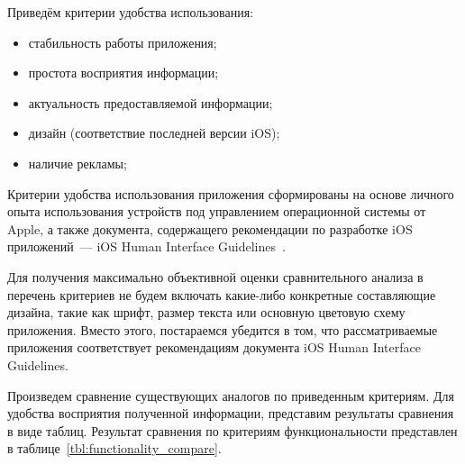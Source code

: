 Приведём критерии удобства использования:
\begin{itemize}
  \item стабильность работы приложения;
  \item простота восприятия информации;
  \item актуальность предоставляемой информации;
  \item дизайн (соответствие последней версии iOS);
  \item наличие рекламы;
\end{itemize}

Критерии удобства использования приложения сформированы на основе личного опыта
использования устройств под управлением операционной системы от Apple, а также
документа, содержащего рекомендации по разработке iOS приложений~---
iOS Human Interface Guidelines~\cite{ios_hig}.

Для получения максимально объективной оценки сравнительного анализа в перечень
критериев не будем включать какие-либо конкретные составляющие дизайна, такие как
шрифт, размер текста или основную цветовую схему приложения. Вместо этого,
постараемся убедится в том, что рассматриваемые приложения
соответствует рекомендациям документа iOS Human Interface Guidelines.

Произведем сравнение существующих аналогов по приведенным критериям. Для удобства
восприятия полученной информации, представим результаты сравнения в виде таблиц.
Результат сравнения по критериям функциональности представлен
в таблице~\ref{tbl:functionality_compare}.

